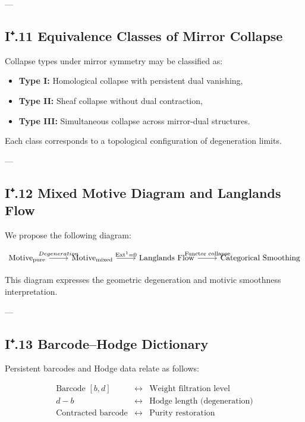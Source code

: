 \documentclass[11pt]{article}
\begin{document}
---

\subsection*{I⁺.11 Equivalence Classes of Mirror Collapse}

Collapse types under mirror symmetry may be classified as:

\begin{itemize}
  \item \textbf{Type I:} Homological collapse with persistent dual vanishing,
  \item \textbf{Type II:} Sheaf collapse without dual contraction,
  \item \textbf{Type III:} Simultaneous collapse across mirror-dual structures.
\end{itemize}

Each class corresponds to a topological configuration of degeneration limits.

---

\subsection*{I⁺.12 Mixed Motive Diagram and Langlands Flow}

We propose the following diagram:

\[
\begin{tikzcd}
\text{Motive}_{\mathrm{pure}} \arrow[r, "Degeneration"]
& \text{Motive}_{\mathrm{mixed}} \arrow[r, "\mathrm{Ext}^1 = 0"]
& \text{Langlands Flow} \arrow[r, "\text{Functor collapse}"]
& \text{Categorical Smoothing}
\end{tikzcd}
\]

This diagram expresses the geometric degeneration and motivic smoothness interpretation.

---

\subsection*{I⁺.13 Barcode–Hodge Dictionary}

Persistent barcodes and Hodge data relate as follows:

\[
\begin{array}{ccc}
\text{Barcode } [b,d] & \leftrightarrow & \text{Weight filtration level} \\
d - b & \leftrightarrow & \text{Hodge length (degeneration)} \\
\text{Contracted barcode} & \leftrightarrow & \text{Purity restoration} \\
\end{array}
\]
\end{document}
